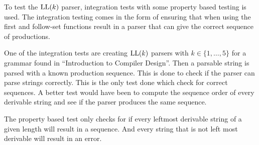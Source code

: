 To test the $\text{LL}(k)$ parser, integration tests with some property based testing is used. The integration testing comes in the form of ensuring that when using the first and follow-set functions result in a parser that can give the correct sequence of productions.

One of the integration tests are creating $\text{LL}(k)$ parsers with $k \in \{1, \dots, 5\}$ for a grammar \cite[45]{Mogensen} found in ``Introduction to Compiler Design''. Then a parsable string is parsed with a known production sequence. This is done to check if the parser can parse strings correctly. This is the only test done which check for correct sequences. A better test would have been to compute the sequence order of every derivable string and see if the parser produces the same sequence.

The property based test only checks for if every leftmost derivable string of a given length will result in a sequence. And every string that is not left most derivable will result in an error. 
